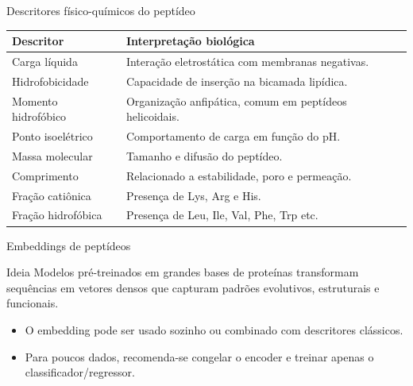 \documentclass[aspectratio=169,10pt]{beamer}
\begin{document}
\begin{frame}{Descritores físico-químicos do peptídeo}
\small
\begin{center}
\begin{tabular}{p{3.5cm}p{8.0cm}}
\toprule
\textbf{Descritor} & \textbf{Interpretação biológica} \\
\midrule
Carga líquida & Interação eletrostática com membranas negativas. \\
Hidrofobicidade & Capacidade de inserção na bicamada lipídica. \\
Momento hidrofóbico & Organização anfipática, comum em peptídeos helicoidais. \\
Ponto isoelétrico & Comportamento de carga em função do pH. \\
Massa molecular & Tamanho e difusão do peptídeo. \\
Comprimento & Relacionado a estabilidade, poro e permeação. \\
Fração catiônica & Presença de Lys, Arg e His. \\
Fração hidrofóbica & Presença de Leu, Ile, Val, Phe, Trp etc. \\
\bottomrule
\end{tabular}
\end{center}
\end{frame}

\begin{frame}{Embeddings de peptídeos}
\begin{block}{Ideia}
Modelos pré-treinados em grandes bases de proteínas transformam sequências em vetores densos que capturam padrões evolutivos, estruturais e funcionais.
\end{block}

\vspace{0.2cm}
\begin{center}
\end{center}

\vspace{0.2cm}
\begin{itemize}
  \item O embedding pode ser usado sozinho ou combinado com descritores clássicos.
  \item Para poucos dados, recomenda-se congelar o encoder e treinar apenas o classificador/regressor.
\end{itemize}
\end{frame}
\end{document}

